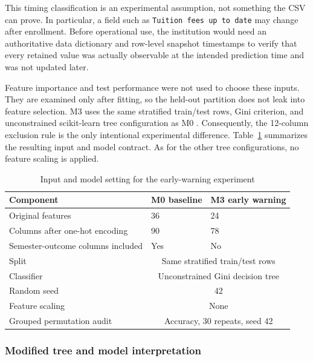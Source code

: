 This timing classification is an experimental assumption, not something the
CSV can prove. In particular, a field such as \texttt{Tuition fees up to date}
may change after enrollment. Before operational use, the institution would need
an authoritative data dictionary and row-level snapshot timestamps to verify
that every retained value was actually observable at the intended prediction
time and was not updated later.

Feature importance and test performance were not used to choose these inputs.
They are examined only after fitting, so the held-out partition does not leak
into feature selection. M3 uses the same stratified train/test rows, Gini
criterion, and unconstrained scikit-learn tree configuration as M0
\citep{pedregosa2011scikit}. Consequently, the 12-column exclusion rule is the
only intentional experimental difference. Table~\ref{tab:f3-setting} summarizes the
resulting input and model contract. As for the other tree configurations, no
feature scaling is applied.

\begin{table}[H]
  \centering
  \small
  \caption{Input and model setting for the early-warning experiment}
  \label{tab:f3-setting}
  \begin{tabular}{@{}lll@{}}
    \toprule
    Component & M0 baseline & M3 early warning \\
    \midrule
    Original features & 36 & 24 \\
    Columns after one-hot encoding & 90 & 78 \\
    Semester-outcome columns included & Yes & No \\
    Split & \multicolumn{2}{c}{Same stratified train/test rows} \\
    Classifier & \multicolumn{2}{c}{Unconstrained Gini decision tree} \\
    Random seed & \multicolumn{2}{c}{42} \\
    Feature scaling & \multicolumn{2}{c}{None} \\
    Grouped permutation audit & \multicolumn{2}{c}{Accuracy, 30 repeats, seed 42} \\
    \bottomrule
  \end{tabular}
\end{table}

\subsubsection{Modified tree and model interpretation}

